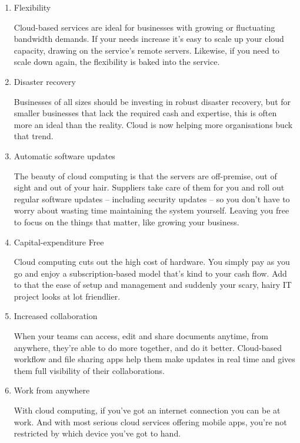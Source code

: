     \begin{enumerate}
    \item Flexibility
    \par Cloud-based services are ideal for businesses with growing or fluctuating bandwidth demands. If your needs increase it’s easy to scale up your cloud capacity, drawing on the service’s remote servers. Likewise, if you need to scale down again, the flexibility is baked into the service\cite{ben}. 
    
    \item Disaster recovery
    \par Businesses of all sizes should be investing in robust disaster recovery, but for smaller businesses that lack the required cash and expertise, this is often more an ideal than the reality. Cloud is now helping more organisations buck that trend\cite{ben}.
    
    \item Automatic software updates
    \par The beauty of cloud computing is that the servers are off-premise, out of sight and out of your hair. Suppliers take care of them for you and roll out regular software updates – including security updates – so you don’t have to worry about wasting time maintaining the system yourself. Leaving you free to focus on the things that matter, like growing your business\cite{ben}.
    
    \item Capital-expenditure Free
    \par Cloud computing cuts out the high cost of hardware. You simply pay as you go and enjoy a subscription-based model that’s kind to your cash flow. Add to that the ease of setup and management and suddenly your scary, hairy IT project looks at lot friendlier\cite{ben}. 
    
    \item Increased collaboration
    \par When your teams can access, edit and share documents anytime, from anywhere, they’re able to do more together, and do it better. Cloud-based workflow and file sharing apps help them make updates in real time and gives them full visibility of their collaborations\cite{ben}.
    
    \item Work from anywhere
    \par With cloud computing, if you’ve got an internet connection you can be at work. And with most serious cloud services offering mobile apps, you’re not restricted by which device you’ve got to hand\cite{ben}.
    

\end{enumerate}
